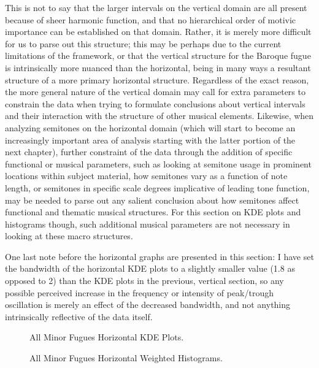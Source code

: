 This is not to say that the larger intervals on the vertical domain are
all present because of sheer harmonic function, and that no hierarchical
order of motivic importance can be established on that domain. Rather,
it is merely more difficult for us to parse out this structure; this may
be perhaps due to the current limitations of the framework, or that the
vertical structure for the Baroque fugue is intrinsically more nuanced
than the horizontal, being in many ways a resultant structure of a more
primary horizontal structure. Regardless of the exact reason, the more
general nature of the vertical domain may call for extra parameters to
constrain the data when trying to formulate conclusions about vertical
intervals and their interaction with the structure of other musical
elements. Likewise, when analyzing semitones on the horizontal domain
(which will start to become an increasingly important area of analysis
starting with the latter portion of the next chapter), further
constraint of the data through the addition of specific functional or
musical parameters, such as looking at semitone usage in prominent
locations within subject material, how semitones vary as a function of
note length, or semitones in specific scale degrees implicative of
leading tone function, may be needed to parse out any salient conclusion
about how semitones affect functional and thematic musical structures.
For this section on KDE plots and histograms though, such additional
musical parameters are not necessary in looking at these macro
structures.

One last note before the horizontal graphs are presented in this
section: I have set the bandwidth of the horizontal KDE plots to a
slightly smaller value (1.8 as opposed to 2) than the KDE plots in the
previous, vertical section, so any possible perceived increase in the
frequency or intensity of peak/trough oscillation is merely an effect of
the decreased bandwidth, and not anything intrinsically reflective of
the data itself.




\begin{figure}[H]
\vspace{1.5em}
    \centering
    \caption{All Minor Fugues Horizontal KDE Plots.}
\end{figure}


\begin{figure}[H]
\vspace{1.5em}
    \centering
    \caption{All Minor Fugues Horizontal Weighted Histograms.}
\end{figure}


